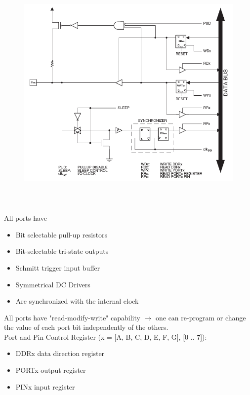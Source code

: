     \begin{figure}[h]
    \centering
    \includegraphics[width=15cm, height=12cm]{Images/image52.png}
    \label{fig:Fig 149}
    \end{figure}

All ports have

\begin{itemize}
\item  Bit selectable pull-up resistors
\item  Bit-selectable tri-state outputs
\item  Schmitt trigger input buffer
\item  Symmetrical DC Drivers
\item  Are synchronized with the internal clock
\end{itemize}

All ports have "read-modify-write" capability $\rightarrow$ one can re-program or change the value of each port bit independently of the others.\\

Port and Pin Control Register (x = [A, B, C, D, E, F, G], [0 .. 7]):

\begin{itemize}
\item  DDRx data direction register
\item  PORTx output register
\item  PINx input register
\end{itemize}

